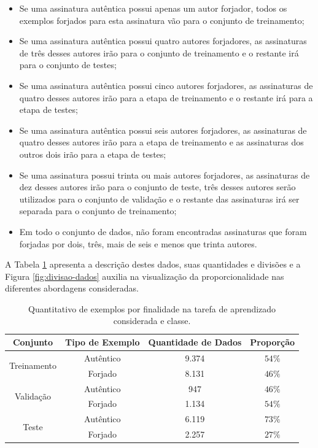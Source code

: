 \begin{itemize}
	\item Se uma assinatura autêntica possui apenas um autor forjador, todos os exemplos forjados para esta assinatura vão para o conjunto de treinamento;
	\item Se uma assinatura autêntica possui quatro autores forjadores, as assinaturas de três desses autores irão para o conjunto de treinamento e o restante irá para o conjunto de testes;
	\item Se uma assinatura autêntica possui cinco autores forjadores, as assinaturas de quatro desses autores irão para a etapa de treinamento e o restante irá para a etapa de testes;
	\item Se uma assinatura autêntica possui seis autores forjadores, as assinaturas de quatro desses autores irão para a etapa de treinamento e as assinaturas dos outros dois irão para a etapa de testes;
	\item Se uma assinatura possui trinta ou mais autores forjadores, as assinaturas de dez desses autores irão para o conjunto de teste, três desses autores serão utilizados para o conjunto de validação e o restante das assinaturas irá ser separada para o conjunto de treinamento;
	\item Em todo o conjunto de dados, não foram encontradas assinaturas que foram forjadas por dois, três, mais de seis e menos que trinta autores.
\end{itemize}

 A Tabela \ref{tab:divisao-dados} apresenta a descrição destes dados, suas quantidades e divisões e a Figura \ref{fig:divisao-dados} auxilia na visualização da proporcionalidade nas diferentes abordagens consideradas.

\begin{table}[h!]
	\centering
	\caption{Quantitativo de exemplos por finalidade na tarefa de aprendizado considerada e classe.}
	\label{tab:divisao-dados}
	\begin{tabular}{c c c c}
		\toprule
		\textbf{Conjunto} & \textbf{Tipo de Exemplo} & \textbf{Quantidade de Dados} & \textbf{Proporção}\\
		\midrule
		\multirow{2}{*}{Treinamento} & Autêntico & 9.374 & $54\%$ \\
    & Forjado & 8.131 & $46\%$\\
     \midrule
		 \multirow{2}{*}{Validação} & Autêntico & 947 & $46\%$ \\
     & Forjado & 1.134 & $54\%$\\
		 \midrule
		 \multirow{2}{*}{Teste} & Autêntico & 6.119 & $73\%$ \\
     & Forjado & 2.257 & $27\%$\\
		\bottomrule
	\end{tabular}
\end{table}

